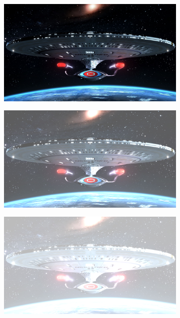 \documentclass{article}
\begin{document}
\begin{figure}[h]
\begin{subfigure}{.3\textwidth}
  \centering
  \includegraphics[width=0.97\linewidth]{_Figures/sample_3.jpg}
  \caption{}
  \label{fig:brigth_raw_3}
\end{subfigure}%
\begin{subfigure}{.3\textwidth}
  \centering
  \includegraphics[width=0.97\linewidth]{_Figures/sample_3_brigthness_low.png}
    \caption{}
      \label{fig:brigth_low_3}
\end{subfigure}
\begin{subfigure}{.3\textwidth}
  \centering
  \includegraphics[width=0.97\linewidth]{_Figures/sample_3_brigthness_high.png}
    \caption{}
        \label{fig:brigth_high_3}
\end{subfigure}


\end{figure}
\end{document}
